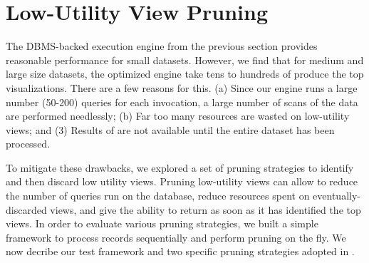 

\section{Low-Utility View Pruning}
\label{sec:in_memory_execution_engine}
The DBMS-backed execution engine from the previous section provides reasonable performance for small datasets.
However, we find that for medium and large size datasets, the optimized engine take tens to hundreds of produce the top visualizations.
There are a few reasons for this. (a) Since our engine runs a large number (50-200) queries for each \SeeDB invocation, a large number of scans of the data are performed needlessly; (b) Far too many resources are wasted on low-utility views; and (3) Results of \SeeDB are not available until the entire dataset has been processed.

To mitigate these drawbacks, we explored a set of pruning strategies to identify and then discard low utility views.
Pruning low-utility views can allow \SeeDB to reduce the number of queries run on the database, reduce resources spent on eventually-discarded views, and give \SeeDB the ability to return as soon as it has identified the top views.
In order to evaluate various pruning strategies, we built a simple framework to process records sequentially and perform pruning on the fly.
We now decribe our test framework and two specific pruning strategies adopted in \SeeDB.


